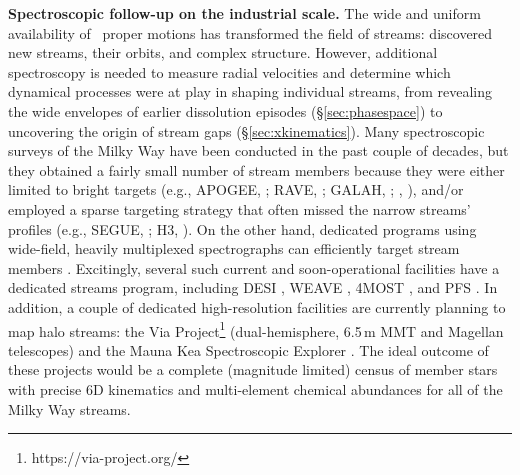 \documentclass[final,5p,times,twocolumn,authoryear]{elsarticle}
\begin{document}
\textbf{Spectroscopic follow-up on the industrial scale.}
The wide and uniform availability of \gaia\ proper motions has transformed the field of streams: discovered new streams, their orbits, and complex structure.
However, additional spectroscopy is needed to measure radial velocities and determine which dynamical processes were at play in shaping individual streams, from revealing the wide envelopes of earlier dissolution episodes (\S\ref{sec:phasespace}) to uncovering the origin of stream gaps (\S\ref{sec:xkinematics}).
Many spectroscopic surveys of the Milky Way have been conducted in the past couple of decades, but they obtained a fairly small number of stream members because they were either limited to bright targets (e.g., APOGEE, \citealt{majewski:2017}; RAVE, \citealt{steinmetz:2020}; GALAH, \citealt{buder:2021}; \gaia, \citealt{katz:2023}), and/or employed a sparse targeting strategy that often missed the narrow streams' profiles (e.g., SEGUE, \citealt{yanny:2009}; H3, \citealt{conroy:2019}).
On the other hand, dedicated programs using wide-field, heavily multiplexed spectrographs can efficiently target stream members \citep[e.g.,][]{li:2021}.
Excitingly, several such current and soon-operational facilities have a dedicated streams program, including DESI \citep[Dark Energy Spectroscopic Instrument,][]{cooper:2023}, WEAVE \citep[William Herschel Telescope Enhanced Area Velocity Explorer,][]{jin:2023}, 4MOST \citep[4-metre Multi-Object Spectroscopic Telescope,][]{dejong:2019}, and PFS \citep[Prime Focus Spectrograph,][]{takada:2014}.
In addition, a couple of dedicated high-resolution facilities are currently planning to map halo streams: the Via Project\footnote{https://via-project.org/} (dual-hemisphere, 6.5\,\unit{m} MMT and Magellan telescopes) and the Mauna Kea Spectroscopic Explorer \citep[MSE,][proposed new 11.25\,\unit{m} facility on Mauna Kea]{mse:2019}.
The ideal outcome of these projects would be a complete (magnitude limited) census of member stars with precise 6D kinematics and multi-element chemical abundances for all of the Milky Way streams.
\end{document}

